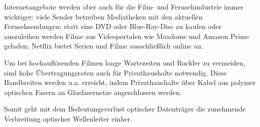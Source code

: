 Internetangebote werden aber auch für die Film- und Fernsehindustrie immer
wichtiger: viele Sender betreiben Mediatheken mit den aktuellen
Fernsehsendungen; statt eine DVD oder Blue-Ray-Disc zu kaufen oder auszuleihen
werden Filme aus Videoportalen wie Maxdome und Amazon Prime geladen; Netflix
bietet Serien und Filme ausschließlich online an.

Um bei hochauflösenden Filmen lange Wartezeiten und \glqq Ruckler\grqq{} zu
vermeiden, sind hohe Übertragungsraten auch für Privathaushalte notwendig. Diese
Bandbreiten werden u.a. erreicht, indem Privathaushalte über Kabel aus polymer
optischen Fasern an Glasfasernetze angeschlossen werden.

Somit geht mit dem Bedeutungsverlust optischer Datenträger die zunehmende
Verbreitung optischer Wellenleiter einher.
